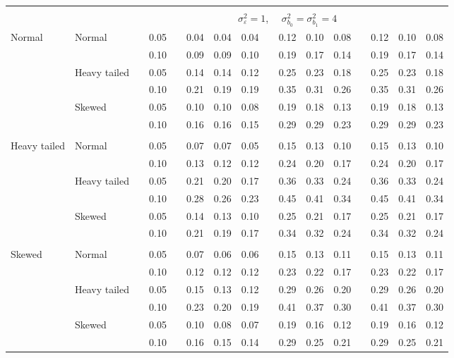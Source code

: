 \documentclass{article} %
\begin{document}
\begin{table}[ht]
\begin{scriptsize}
\begin{center}
\begin{tabular}{ll p{.1cm} c p{.1cm} rrr p{.1cm} rrr p{.1cm} rrr}
&&&&&&&&&&&&&&&\\
& && && \multicolumn{9}{c}{$\sigma_{\varepsilon}^2 = 1$, \ \ $\sigma_{b_0}^2 = \sigma_{b_1}^2 = 4$} \\ \cline{6-16}
Normal       & Normal       && 0.05 &&  0.04 & 0.04 & 0.04 && 0.12 & 0.10 & 0.08 && 0.12 & 0.10 & 0.08 \\ 
             &              && 0.10 &&  0.09 & 0.09 & 0.10 && 0.19 & 0.17 & 0.14 && 0.19 & 0.17 & 0.14 \\ 
             & Heavy tailed && 0.05 &&  0.14 & 0.14 & 0.12 && 0.25 & 0.23 & 0.18 && 0.25 & 0.23 & 0.18 \\ 
             &              && 0.10 &&  0.21 & 0.19 & 0.19 && 0.35 & 0.31 & 0.26 && 0.35 & 0.31 & 0.26 \\ 
             & Skewed       && 0.05 &&  0.10 & 0.10 & 0.08 && 0.19 & 0.18 & 0.13 && 0.19 & 0.18 & 0.13 \\ 
             &              && 0.10 &&  0.16 & 0.16 & 0.15 && 0.29 & 0.29 & 0.23 && 0.29 & 0.29 & 0.23 \\ 
             &&&&&&&&&&&&&&&\\
Heavy tailed & Normal       && 0.05 &&  0.07 & 0.07 & 0.05 && 0.15 & 0.13 & 0.10 && 0.15 & 0.13 & 0.10 \\ 
             &              && 0.10 &&  0.13 & 0.12 & 0.12 && 0.24 & 0.20 & 0.17 && 0.24 & 0.20 & 0.17 \\ 
             & Heavy tailed && 0.05 &&  0.21 & 0.20 & 0.17 && 0.36 & 0.33 & 0.24 && 0.36 & 0.33 & 0.24 \\ 
             &              && 0.10 &&  0.28 & 0.26 & 0.23 && 0.45 & 0.41 & 0.34 && 0.45 & 0.41 & 0.34 \\ 
             & Skewed       && 0.05 &&  0.14 & 0.13 & 0.10 && 0.25 & 0.21 & 0.17 && 0.25 & 0.21 & 0.17 \\ 
             &              && 0.10 &&  0.21 & 0.19 & 0.17 && 0.34 & 0.32 & 0.24 && 0.34 & 0.32 & 0.24 \\ 
             &&&&&&&&&&&&&&&\\
Skewed       & Normal       && 0.05 &&  0.07 & 0.06 & 0.06 && 0.15 & 0.13 & 0.11 && 0.15 & 0.13 & 0.11 \\ 
             &              && 0.10 &&  0.12 & 0.12 & 0.12 && 0.23 & 0.22 & 0.17 && 0.23 & 0.22 & 0.17 \\ 
             & Heavy tailed && 0.05 &&  0.15 & 0.13 & 0.12 && 0.29 & 0.26 & 0.20 && 0.29 & 0.26 & 0.20 \\ 
             &              && 0.10 &&  0.23 & 0.20 & 0.19 && 0.41 & 0.37 & 0.30 && 0.41 & 0.37 & 0.30 \\ 
             & Skewed       && 0.05 &&  0.10 & 0.08 & 0.07 && 0.19 & 0.16 & 0.12 && 0.19 & 0.16 & 0.12 \\ 
             &              && 0.10 &&  0.16 & 0.15 & 0.14 && 0.29 & 0.25 & 0.21 && 0.29 & 0.25 & 0.21 \\ 



\end{tabular}
\end{center}
\end{scriptsize}
\end{table}
\end{document}
